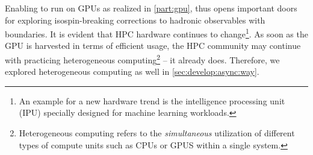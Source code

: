 
Enabling \openqxd to run on GPUs as realized in \cref{part:gpu}, thus opens important doors for exploring isospin-breaking corrections to hadronic observables with \Cstar boundaries.
It is evident that HPC hardware continues to change\footnote{An example for a new hardware trend is the intelligence processing unit~\cite{ipu} (IPU) specially designed for machine learning workloads.}.
As soon as the GPU is harvested in terms of efficient usage, the HPC community may continue with practicing heterogeneous computing\footnote{Heterogeneous computing refers to the \emph{simultaneous} utilization of different types of compute units such as CPUs or GPUS within a single system.} -- it already does.
Therefore, we explored heterogeneous computing as well in \cref{sec:develop:async:way}.


